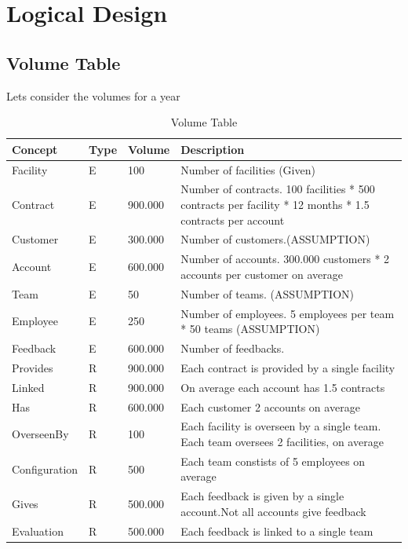 \section{Logical Design}

\subsection{Volume Table}
Lets consider the volumes for a year

\begin{table}[H]
    \scriptsize
    \renewcommand{\arraystretch}{1.3} %
    \begin{tabularx}{\textwidth}{|X|X|X|X|}
    \hline
    \textbf{Concept}& \textbf{Type}  & \textbf{Volume}    & \textbf{Description}     \\ \hline
    Facility & E & 100 & Number of facilities (Given) \\ \hline
    Contract & E & 900.000 & Number of contracts. 100 facilities * 500 contracts per facility * 12 months * 1.5 contracts per account \\ \hline
    Customer & E & 300.000 & Number of customers.(ASSUMPTION) \\ \hline
    Account & E & 600.000 & Number of accounts. 300.000 customers * 2 accounts per customer on average\\ \hline
    Team & E & 50 & Number of teams. (ASSUMPTION) \\ \hline
    Employee & E & 250 & Number of employees. 5 employees per team * 50 teams (ASSUMPTION) \\ \hline
    Feedback & E & 600.000 & Number of feedbacks.\\ \hline
    Provides & R & 900.000 & Each contract is provided by a single facility \\ \hline
    Linked & R & 900.000 & On average each account has 1.5 contracts \\ \hline
    Has & R & 600.000 & Each customer 2 accounts on average \\ \hline
    OverseenBy & R & 100 & Each facility is overseen by a single team. Each team oversees 2 facilities, on average \\ \hline
    Configuration & R & 500 & Each team constists of 5 employees on average \\ \hline
    Gives & R & 500.000 & Each feedback is given by a single account.Not all accounts give feedback  \\ \hline
    Evaluation & R & 500.000 & Each feedback is linked to a single team\\ \hline
    \end{tabularx}
    \caption{Volume Table}
\end{table}

